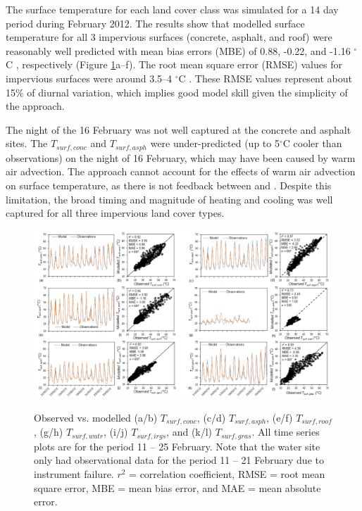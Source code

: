 \documentclass[final,3p,times,authoryear]{elsarticle}
\newcommand{\degreeC}{\ensuremath{^\circ}C }
\begin{document}
The surface temperature for each land cover class was simulated for a 14 day period during February 2012. The results show that modelled surface temperature for all 3 impervious surfaces (concrete, asphalt, and roof) were reasonably well predicted with mean bias errors (MBE) of 0.88, -0.22, and -1.16 \degreeC, respectively (Figure \ref{fig:Tsurf_panel}a--f). The root mean square error (RMSE) values for impervious surfaces were around 3.5--4 \degreeC. These RMSE values represent about 15\% of diurnal  variation, which implies good model skill given the simplicity of the approach.  



The night of the 16 February was not well captured at the concrete and asphalt sites. The $T_{surf,conc}$ and $T_{surf,asph}$ were under-predicted (up to 5\degreeC cooler than observations) on the night of 16 February, which may have been caused by warm air advection. The  approach  cannot account for the effects of warm air advection on surface temperature, as there is not feedback between  and .  Despite this limitation, the broad timing and magnitude of heating and cooling was well captured for all three impervious land cover types. 


\begin{figure}
\includegraphics[width=1\textwidth]{figure4.png}
\label{fig:Tsurf_panel}
\caption{Observed vs. modelled (a/b) $T_{surf,conc}$, (c/d) $ T_{surf,asph}$, (e/f) $T_{surf,roof}$, (g/h) $T_{surf,watr}$, (i/j) $T_{surf,irgs}$, and (k/l)  $T_{surf,gras}$. All time series plots are for the period 11 -- 25 February. Note that the water site only had observational data for the period 11 -- 21 February due to instrument failure. $r^{2}$ = correlation coefficient, RMSE = root mean square error, MBE = mean bias error, and MAE = mean absolute error. }
\end{figure}
\end{document}

